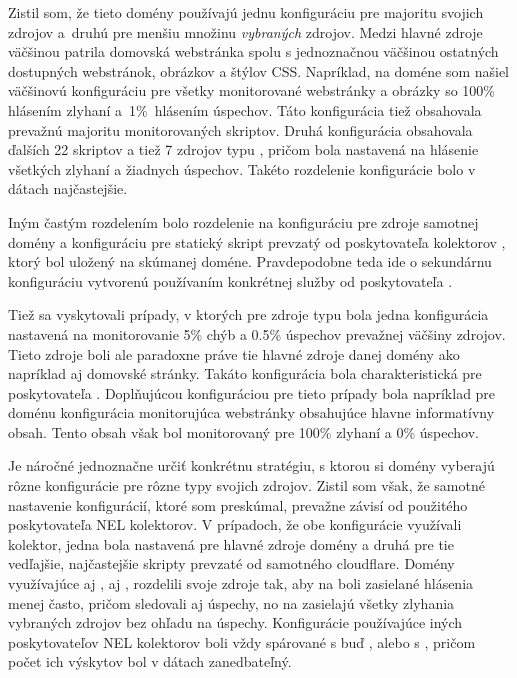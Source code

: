 Zistil som, že tieto domény používajú jednu konfiguráciu pre majoritu svojich zdrojov \mbox{a druhú} pre menšiu množinu \textit{vybraných} zdrojov.
Medzi hlavné zdroje väčšinou patrila domovská webstránka spolu s jednoznačnou väčšinou ostatných dostupných webstránok, obrázkov a štýlov CSS.
Napríklad, na doméne  som našiel väčšinovú konfiguráciu pre všetky monitorované webstránky a obrázky so 100\% hlásením zlyhaní \mbox{a 1\% hlásením} úspechov. 
Táto konfigurácia tiež obsahovala prevažnú majoritu monitorovaných skriptov.
Druhá konfigurácia obsahovala ďalších 22 skriptov a tiež 7 zdrojov typu ,
pričom bola nastavená na hlásenie všetkých zlyhaní a žiadnych úspechov.
Takéto rozdelenie konfigurácie bolo v dátach najčastejšie.

Iným častým rozdelením bolo rozdelenie na konfiguráciu pre zdroje samotnej domény a konfiguráciu pre statický skript prevzatý od poskytovateľa kolektorov , ktorý bol uložený na skúmanej doméne.
Pravdepodobne teda ide o sekundárnu konfiguráciu vytvorenú používaním konkrétnej služby od poskytovateľa .

Tiež sa vyskytovali prípady, v ktorých pre zdroje typu  bola jedna konfigurácia nastavená na monitorovanie 5\% chýb a 0.5\% úspechov prevažnej väčšiny zdrojov.
Tieto zdroje boli ale paradoxne práve tie hlavné zdroje danej domény ako napríklad aj domovské stránky.
Takáto konfigurácia bola charakteristická pre poskytovateľa .
Doplňujúcou konfiguráciou pre tieto prípady bola napríklad pre doménu  konfigurácia monitorujúca webstránky obsahujúce hlavne informatívny obsah.
Tento obsah však bol monitorovaný pre 100\% zlyhaní a 0\% úspechov.

Je náročné jednoznačne určiť konkrétnu stratégiu, s ktorou si domény vyberajú rôzne konfigurácie pre rôzne typy svojich zdrojov.
Zistil som však, že samotné nastavenie konfigurácií, ktoré som preskúmal, prevažne závisí od použitého poskytovateľa NEL kolektorov.
V prípadoch, že obe konfigurácie využívali  kolektor, jedna bola nastavená pre hlavné zdroje domény a druhá pre tie vedľajšie, najčastejšie skripty prevzaté od samotného cloudflare.
Domény využívajúce aj , aj , rozdelili svoje zdroje tak, aby na  boli zasielané hlásenia menej často, pričom sledovali aj úspechy, no na  zasielajú všetky zlyhania vybraných zdrojov bez ohľadu na úspechy. 
Konfigurácie používajúce iných poskytovateľov NEL kolektorov boli vždy spárované s buď , alebo s , pričom počet ich výskytov bol v dátach zanedbateľný.





